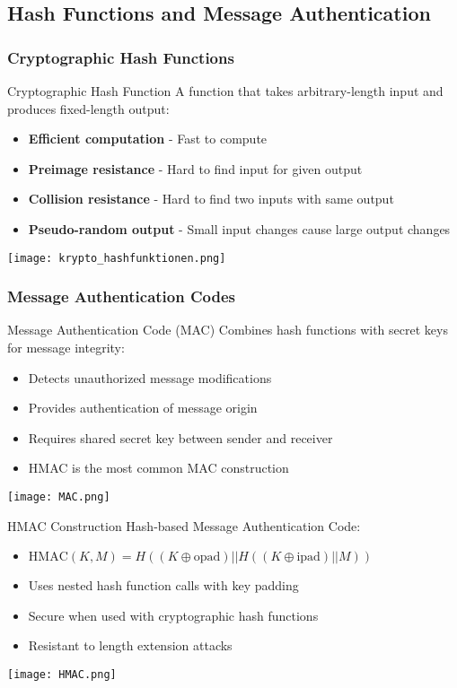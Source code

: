 \subsection{Hash Functions and Message Authentication}

\subsubsection{Cryptographic Hash Functions}

\begin{definition}{Cryptographic Hash Function}
    A function that takes arbitrary-length input and produces fixed-length output:
    \begin{itemize}
        \item \textbf{Efficient computation} - Fast to compute
        \item \textbf{Preimage resistance} - Hard to find input for given output
        \item \textbf{Collision resistance} - Hard to find two inputs with same output
        \item \textbf{Pseudo-random output} - Small input changes cause large output changes
    \end{itemize}
    \texttt{[image: krypto\_hashfunktionen.png]}
\end{definition}

\subsubsection{Message Authentication Codes}

\begin{definition}{Message Authentication Code (MAC)}
    Combines hash functions with secret keys for message integrity:
    \begin{itemize}
        \item Detects unauthorized message modifications
        \item Provides authentication of message origin
        \item Requires shared secret key between sender and receiver
        \item HMAC is the most common MAC construction
    \end{itemize}
    \texttt{[image: MAC.png]}
\end{definition}

\begin{concept}{HMAC Construction}
    Hash-based Message Authentication Code:
    \begin{itemize}
        \item $\text{HMAC}(K, M) = H((K \oplus \text{opad}) || H((K \oplus \text{ipad}) || M))$
        \item Uses nested hash function calls with key padding
        \item Secure when used with cryptographic hash functions
        \item Resistant to length extension attacks
    \end{itemize}
    \texttt{[image: HMAC.png]}
\end{concept}

